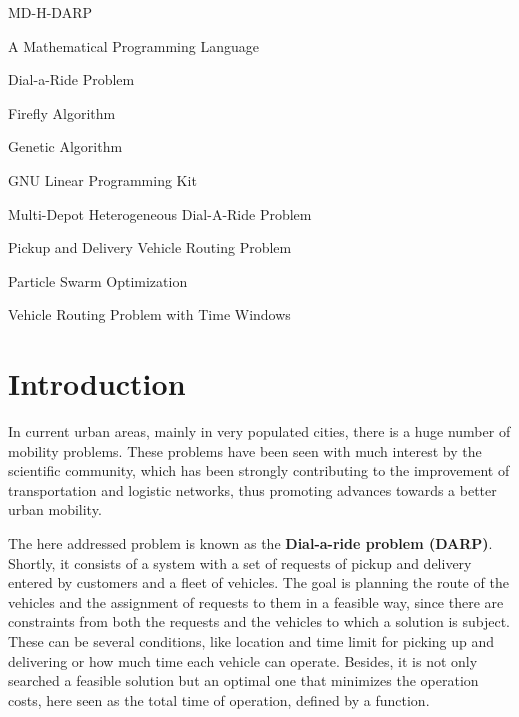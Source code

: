 \documentclass[tuberlin,cic,tc,openright,english,noabntcite,oneside]{iiufrgs}
\begin{document}
\begin{listofabbrv}{MD-H-DARP}
	\item[AMPL] A Mathematical Programming Language
    \item[DARP] Dial-a-Ride Problem
    \item[FA] Firefly Algorithm
    \item[GA] Genetic Algorithm
    \item[GLPK] GNU Linear Programming Kit
    \item[MD-H-DARP] Multi-Depot Heterogeneous Dial-A-Ride Problem
    \item[PDVRP] Pickup and Delivery Vehicle Routing Problem
    \item[PSO] Particle Swarm Optimization
    \item[VRPTW] Vehicle Routing Problem with Time Windows
\end{listofabbrv}


\tableofcontents


\chapter{Introduction}
In current urban areas, mainly in very populated cities, there is a huge number of mobility problems. These problems have been seen with much interest by the scientific community, which has been strongly contributing to the improvement of transportation and logistic networks, thus promoting advances towards a better urban mobility.

The here addressed problem is known as the \textbf{Dial-a-ride problem (DARP)}. Shortly, it consists of a system with a set of requests of pickup and delivery entered by customers and a fleet of vehicles. The goal is planning the route of the vehicles and the assignment of requests to them in a feasible way, since there are constraints from both the requests and the vehicles to which a solution is subject. These can be several conditions, like location and time limit for picking up and delivering or how much time each vehicle can operate. Besides, it is not only searched a feasible solution but an optimal one that minimizes the operation costs, here seen as the total time of operation, defined by a function.
\end{document}
